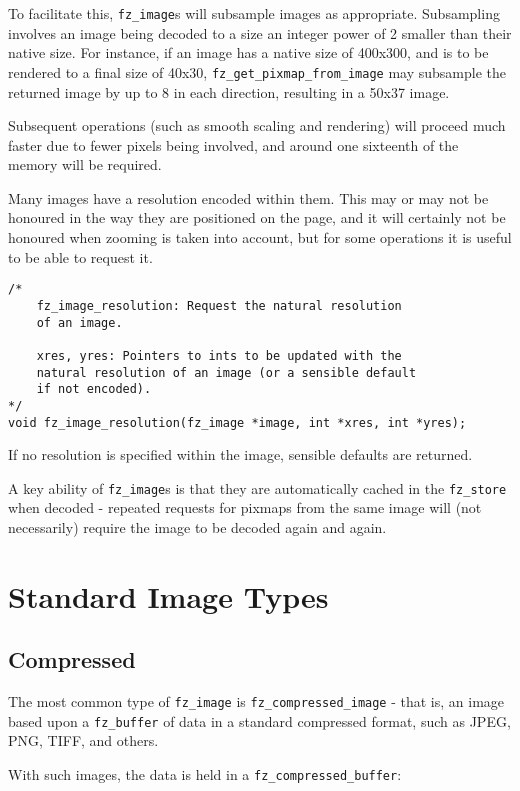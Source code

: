 \documentclass[oneside]{book}
\begin{document}
To facilitate this, \texttt{fz\_image}s will subsample images as appropriate. Subsampling involves an image being decoded to a size an integer power of 2 smaller than their native size. For instance, if an image has a native size of 400x300, and is to be rendered to a final size of 40x30, \texttt{fz\_get\_pixmap\_from\_image} may subsample the returned image by up to 8 in each direction, resulting in a 50x37 image.

Subsequent operations (such as smooth scaling and rendering) will proceed much faster due to fewer pixels being involved, and around one sixteenth of the memory will be required.

Many images have a resolution encoded within them. This may or may not be honoured in the way they are positioned on the page, and it will certainly not be honoured when zooming is taken into account, but for some operations it is useful to be able to request it.

\begin{lstlisting}
/*
	fz_image_resolution: Request the natural resolution
	of an image.

	xres, yres: Pointers to ints to be updated with the
	natural resolution of an image (or a sensible default
	if not encoded).
*/
void fz_image_resolution(fz_image *image, int *xres, int *yres);
\end{lstlisting}

If no resolution is specified within the image, sensible defaults are returned.

A key ability of \texttt{fz\_image}s is that they are automatically cached in the \texttt{fz\_store} when decoded - repeated requests for pixmaps from the same image will (not necessarily) require the image to be decoded again and again.

\section{Standard Image Types}
\subsection{Compressed}

The most common type of \texttt{fz\_image} is \texttt{fz\_compressed\_image} - that is, an image based upon a \texttt{fz\_buffer} of data in a standard compressed format, such as JPEG, PNG, TIFF, and others.

With such images, the data is held in a \texttt{fz\_compressed\_buffer}:
\end{document}
